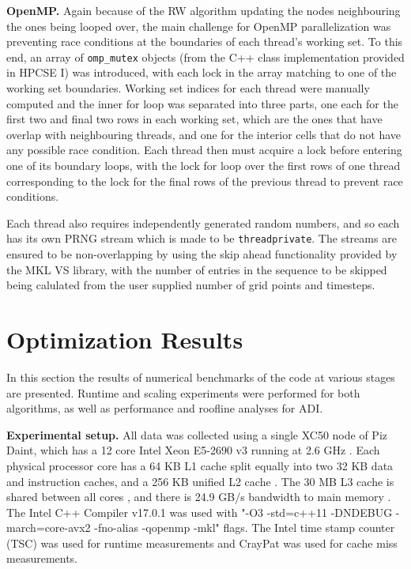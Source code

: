 \documentclass[letterpaper]{article}
\newcommand{\mypar}[1]{{\bf #1.}}
\begin{document}
\mypar{OpenMP}
Again because of the RW algorithm updating the nodes neighbouring the ones being looped over, the main challenge for OpenMP parallelization was preventing race conditions at the boundaries of each thread's working set. To this end, an array of {\tt omp\_mutex} objects (from the C++ class implementation provided in HPCSE I) was introduced, with each lock in the array matching to one of the working set boundaries. Working set indices for each thread were manually computed and the inner for loop was separated into three parts, one each for the first two and final two rows in each working set, which are the ones that have overlap with neighbouring threads, and one for the interior cells that do not have any possible race condition. Each thread then must acquire a lock before entering one of its boundary loops, with the lock for loop over the first rows of one thread corresponding to the lock for the final rows of the previous thread to prevent race conditions.

Each thread also requires independently generated random numbers, and so each has its own PRNG stream which is made to be {\tt threadprivate}. The streams are ensured to be non-overlapping by using the skip ahead functionality provided by the MKL VS library, with the number of entries in the sequence to be skipped being calulated from the user supplied number of grid points and timesteps.


\section{Optimization Results}\label{sec:results}

In this section the results of numerical benchmarks of the code at various stages are presented. Runtime and scaling experiments were performed for both algorithms, as well as performance and roofline analyses for ADI.

\mypar{Experimental setup}
All data was collected using a single XC50 node of Piz Daint, which has a 12 core Intel Xeon E5-2690 v3 running at 2.6 GHz \cite{daint}. Each physical processor core has a 64 KB L1 cache split equally into two 32 KB data and instruction caches, and a 256 KB unified L2 cache \cite{cpu_world}. The 30 MB L3 cache is shared between all cores \cite{ark_intel}, and there is 24.9 GB/s bandwidth to main memory \cite{7_cpu}. The Intel C++ Compiler v17.0.1 was used with "-O3 -std=c++11 -DNDEBUG -march=core-avx2 -fno-alias -qopenmp -mkl" flags. The Intel time stamp counter (TSC) was used for runtime measurements and CrayPat was used for cache miss measurements.
\end{document}
